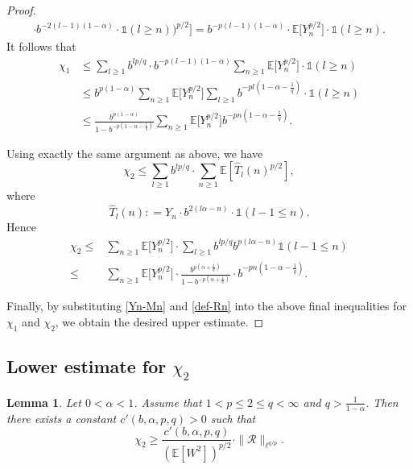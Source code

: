 \documentclass[12pt]{amsart}
\newtheorem{lemma}[theorem]{Lemma}
\theoremstyle{definition}
\theoremstyle{remark}
\newcommand{\E}{\mathbb{E}}
\newcommand{\indi}{\mathds{1}}
\numberwithin{equation}{section}
\begin{document}
\begin{proof}
\begin{align*}
\cdot   b^{-2(l-1)(1 - \alpha)}  \cdot \indi(l  \ge n)\Big)^{p/2}\Big] = b^{-p (l-1)(1-\alpha)}  \cdot  \E\big [  Y_n^{p/2}\big] \cdot \indi( l  \ge n). 
\end{align*}
It follows that 
\begin{align*}
\chi_1& \le  \sum_{l  \ge 1}   b^{lp/q}  \cdot  b^{-p (l-1)(1-\alpha)}  \sum_{n\ge 1} \E \big[ Y_n^{p/2}\big] \cdot \indi( l \ge n)
\\
& \le  b^{p(1-\alpha)} \sum_{n\ge 1}    \E \big[  Y_n^{p/2}\big] \sum_{l\ge 1}  b^{-pl (1-\alpha- \frac{1}{q})}   \cdot \indi( l  \ge n)
\\
 &\le \frac{b^{p(1-\alpha)}}{1- b^{-p (1-\alpha- \frac{1}{q})} }\sum_{n\ge 1}    \E \big[   Y_n^{p/2}]  b^{-p n (1 - \alpha -  \frac{1}{q})}. 
\end{align*}

Using exactly the same argument as above, we have 
\[
\chi_2\le  \sum_{l  \ge 1}   b^{lp/q}  \cdot  \sum_{n\ge 1}   \E[\widehat{T}_l(n)^{p/2}],
\]
where
\[
\widehat{T}_l(n): =   Y_n \cdot b^{2(l\alpha-n)}  \cdot   \indi(l-1 \le  n).
\]
Hence
\begin{align*}
\chi_2\le  &  \sum_{n\ge 1}   \E\big[Y_n^{p/2}  \big]\cdot    \sum_{l  \ge 1}    b^{lp/q}  b^{p(l\alpha-n)}        \indi(l-1\le n)
 \\
\le & \sum_{n\ge 1}   \E\big[Y_n^{p/2}  \big]     \cdot   \frac{b^{p(\alpha + \frac{1}{q})}}{1 - b^{-p(\alpha + \frac{1}{q})}}  \cdot b^{-pn (1 - \alpha - \frac{1}{q})}.
\end{align*}

Finally, by substituting \eqref{Yn-Mn} and \eqref{def-Rn} into the above final inequalities for $\chi_1$ and $\chi_2$, we  obtain the desired upper estimate. 
\end{proof}





\subsection{Lower estimate for $\chi_2$}

\begin{lemma}\label{lem-low-chi2}
Let $0<\alpha<1$.  Assume that $1< p\le 2 \le q <\infty$ and $q> \frac{1}{1 - \alpha}$.  Then there exists a constant $c'(b, \alpha, p, q)>0$ such that 
\[
\chi_2 \ge \frac{c'(b, \alpha, p, q)}{(\E[W^2])^{p/2}} \cdot \| \mathcal{R}\|_{\ell^{q/p}}. 
\]
\end{lemma}
\end{document}
